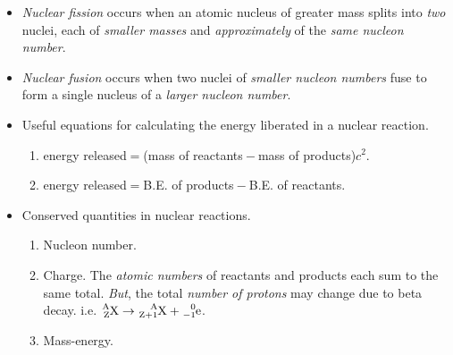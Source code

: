 \documentclass[oneside]{book}
\begin{document}
\begin{minipage}{0.5\textwidth}
    \begin{itemize}
        \item[\AsteriskThin] \emph{Nuclear fission} occurs when an atomic nucleus of greater mass splits into \emph{two} nuclei, each of \emph{smaller masses} and \emph{approximately} of the \emph{same nucleon number}.
        \item[\AsteriskThin] \emph{Nuclear fusion} occurs when two nuclei of \emph{smaller nucleon numbers} fuse to form a single nucleus of a \emph{larger nucleon number}.
        \item Useful equations for calculating the energy liberated in a nuclear reaction. 
        \begin{enumerate}
            \item energy released\({}={}\)(mass of reactants\({}-{}\)mass of products)\({}c^2\).
            \item energy released\({}={}\)B.E. of products\({}-{}\)B.E. of reactants.
        \end{enumerate}
        \item Conserved quantities in nuclear reactions.
        \begin{enumerate}
            \item Nucleon number.
            \item Charge. The \emph{atomic numbers} of reactants and products each sum to the same total. \emph{But}, the total \emph{number of protons} may change due to beta decay. i.e. 
            \(\ce{_Z^A\text{X}}\to\ce{_{Z+1}^A\text{X}}+\ce{_{-1}^0\text{e}}\).
            \item Mass-energy.
        \end{enumerate}
    \end{itemize}
\end{minipage}
\end{document}
